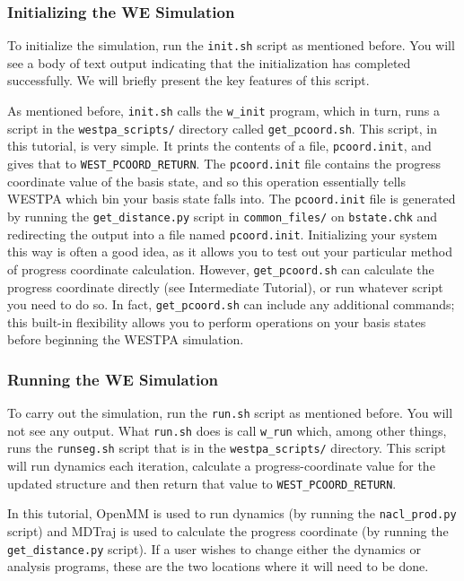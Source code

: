 \documentclass[9pt,tutorial,pubversion]{livecoms}
\begin{document}
\subsubsection{Initializing the WE Simulation}

To initialize the simulation, run the \verb|init.sh| script as mentioned before. 
You will see a body of text output indicating that the initialization has completed successfully. 
We will briefly present the key features of this script. 

As mentioned before, \verb|init.sh| calls the \verb|w_init| program, which in turn, runs a script in the \verb|westpa_scripts/| directory called \verb|get_pcoord.sh|. 
This script, in this tutorial, is very simple. 
It prints the contents of a file, \verb|pcoord.init|, and gives that to \verb|WEST_PCOORD_RETURN|.
The \verb|pcoord.init| file contains the progress coordinate value of the basis state, and so this operation essentially tells WESTPA which bin your basis state falls into. 
The \verb|pcoord.init| file is generated by running the \verb|get_distance.py| script in \verb|common_files/| on \verb|bstate.chk| and redirecting the output into a file named \verb|pcoord.init|. 
Initializing your system this way is often a good idea, as it allows you to test out your particular method of progress coordinate calculation.  
However, \verb|get_pcoord.sh| can calculate the progress coordinate directly (see Intermediate Tutorial), or run whatever script you need to do so.  
In fact, \verb|get_pcoord.sh| can include any additional commands; this built-in flexibility allows you to perform operations on your basis states before beginning the WESTPA simulation. 

\subsubsection{Running the WE Simulation}

To carry out the simulation, run the \verb|run.sh| script as mentioned before. 
You will not see any output. What \verb|run.sh| does is call \verb|w_run| which, among other things, runs the \verb|runseg.sh| script that is in the \verb|westpa_scripts/| directory. 
This script will run dynamics each iteration, calculate a progress-coordinate value for the updated structure and then return that value to \verb|WEST_PCOORD_RETURN|. 

In this tutorial, OpenMM is used to run dynamics (by running the \verb|nacl_prod.py| script) and MDTraj is used to calculate the progress coordinate (by running the \verb|get_distance.py| script).  
If a user wishes to change either the dynamics or analysis programs, these are the two locations where it will need to be done. 
\end{document}
